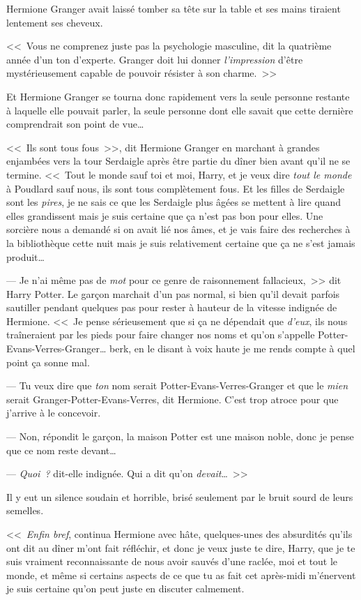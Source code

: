 Hermione Granger avait laissé tomber sa tête sur la table et ses mains tiraient lentement ses cheveux.

<<~Vous ne comprenez juste pas la psychologie masculine, dit la quatrième année d'un ton d'experte. Granger doit lui donner \emph{l'impression} d'être mystérieusement capable de pouvoir résister à son charme.~>>


Et Hermione Granger se tourna donc rapidement vers la seule personne restante à laquelle elle pouvait parler, la seule personne dont elle savait que cette dernière comprendrait son point de vue…

<<~Ils sont tous fous~>>, dit Hermione Granger en marchant à grandes enjambées vers la tour Serdaigle après être partie du dîner bien avant qu'il ne se termine. <<~Tout le monde sauf toi et moi, Harry, et je veux dire \emph{tout le monde} à Poudlard sauf nous, ils sont tous complètement fous. Et les filles de Serdaigle sont les \emph{pires}, je ne sais ce que les Serdaigle plus âgées se mettent à lire quand elles grandissent mais je suis certaine que ça n'est pas bon pour elles. Une sorcière nous a demandé si on avait lié nos âmes, et je vais faire des recherches à la bibliothèque cette nuit mais je suis relativement certaine que ça ne s'est jamais produit…

--- Je n'ai même pas de \emph{mot} pour ce genre de raisonnement fallacieux,~>> dit Harry Potter. Le garçon marchait d'un pas normal, si bien qu'il devait parfois sautiller pendant quelques pas pour rester à hauteur de la vitesse indignée de Hermione. <<~Je pense sérieusement que si ça ne dépendait que \emph{d'eux}, ils nous traîneraient par les pieds pour faire changer nos noms et qu'on s'appelle Potter-Evans-Verres-Granger… berk, en le disant à voix haute je me rends compte à quel point ça sonne mal.

--- Tu veux dire que \emph{ton} nom serait Potter-Evans-Verres-Granger et que le \emph{mien} serait Granger-Potter-Evans-Verres, dit Hermione. C'est trop atroce pour que j'arrive à le concevoir.

--- Non, répondit le garçon, la maison Potter est une maison noble, donc je pense que ce nom reste devant…

--- \emph{Quoi~?} dit-elle indignée. Qui a dit qu'on \emph{devait}…~>>

Il y eut un silence soudain et horrible, brisé seulement par le bruit sourd de leurs semelles.

<<~\emph{Enfin bref}, continua Hermione avec hâte, quelques-unes des absurdités qu'ils ont dit au dîner m'ont fait réfléchir, et donc je veux juste te dire, Harry, que je te suis vraiment reconnaissante de nous avoir sauvés d'une raclée, moi et tout le monde, et même si certains aspects de ce que tu as fait cet après-midi m'énervent je suis certaine qu'on peut juste en discuter calmement.


